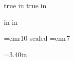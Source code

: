 %
%



\eightpoint

\sloppy

\newif\iflong %
\longfalse
\def\piflong#1{\iflong#1
\else\fi}%
\long\def\lpiflong#1{\iflong#1
\else\fi}%

\def\xpair{{x_1,x_2}}

 true in
 true in
\nopagenumbers

\def\complex{{\bf C}}
\def\real{{\bf R}}
\def\field{{\bf F}}
\def\polynomial{{\cal P}}
\def\dim{{\rm dim}\ }
\def\mnull{{\rm null}\ }
\def\mrange{{\rm range}\ }
\def\mspan{{\rm span}\ }
\def\linear{{\cal L}}
\def\mapmatrix{{\cal M}}

 in
 in
\hsize=10.6in
\vsize=8.05in
\parindent=0pt

\font\bigger =cmr10 scaled
\font\smallfont=cmr7

\def\strutA#1#2{\vrule height#1 depth#2 width0pt}
\def\chapter#1{\vskip 5pt {\bigger #1}}

=3.40in
\newbox\bigbox


\def\dtablestart#1#2{\halign\bgroup \vtop{\parindent=0pt\hsize=#1\strut##\strut}\hfil&\hskip 0.10 in\vtop{\parindent=0pt\hsize=#2\strut##\strut}\cr}
\def\dtableend{\egroup}



